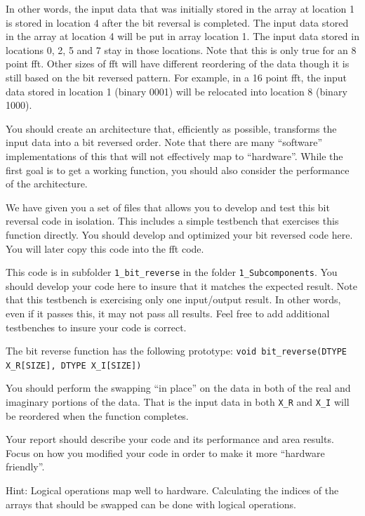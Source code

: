 In other words, the input data that was initially stored in the array at location 1 is stored in location 4 after the bit reversal is completed. The input data stored in the array at location 4 will be put in array location 1. The input data stored in locations 0, 2, 5 and 7 stay in those locations. Note that this is only true for an 8 point \gls{fft}. Other sizes of \gls{fft} will have different reordering of the data though it is still based on the bit reversed pattern. For example, in a 16 point \gls{fft}, the input data stored in location 1 (binary 0001) will be relocated into location 8 (binary 1000).

You should create an architecture that, efficiently as possible, transforms the input data into a bit reversed order. Note that there are many ``software'' implementations of this that will not effectively map to ``hardware''. While the first goal is to get a working function, you should also consider the performance of the architecture.

We have given you a set of files that allows you to develop and test this bit reversal code in isolation. This includes a simple testbench that exercises this function directly. You should develop and optimized your bit reversed code here. You will later copy this code into the \gls{fft} code.

This code is in subfolder \texttt{1\_bit\_reverse} in the folder \texttt{1\_Subcomponents}. You should develop your code here to insure that it matches the expected result. Note that this testbench is exercising only one input/output result. In other words, even if it passes this, it may not pass all results. Feel free to add additional testbenches to insure your code is correct.

The bit reverse function has the following prototype: \texttt{void bit\_reverse(DTYPE X\_R[SIZE], DTYPE X\_I[SIZE])}

You should perform the swapping ``in place'' on the data in both of the real and imaginary portions of the data. That is the input data in both \texttt{X\_R} and \texttt{X\_I} will be reordered when the function completes.

Your report should describe your code and its performance and area results. Focus on how you modified your code in order to make it more ``hardware friendly''.

Hint: Logical operations map well to hardware. Calculating the indices of the arrays that should be swapped can be done with logical operations. 

